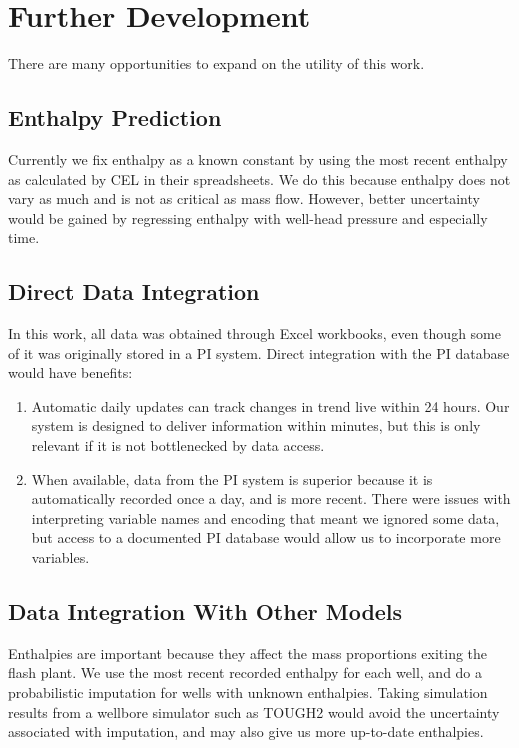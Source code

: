 \documentclass[a4paper, 12pt]{article}
\begin{document}

\section{Further Development}
There are many opportunities to expand on the utility of this work.

\subsection{Enthalpy Prediction}
Currently we fix enthalpy as a known constant by using the most recent enthalpy as calculated by CEL in their spreadsheets. We do this because enthalpy does not vary as much and is not as critical as mass flow. However, better uncertainty would be gained by regressing enthalpy with well-head pressure and especially time.

\subsection{Direct Data Integration}
In this work, all data was obtained through Excel workbooks, even though some of it was originally stored in a PI system. Direct integration with the PI database would have benefits:

\begin{enumerate}
\item Automatic daily updates can track changes in trend live within 24 hours. Our system is designed to deliver information within minutes, but this is only relevant if it is not bottlenecked by data access.
\item When available, data from the PI system is superior because it is automatically recorded once a day, and is more recent. There were issues with interpreting variable names and encoding that meant we ignored some data, but access to a documented PI database would allow us to incorporate more variables.
\end{enumerate}

\subsection{Data Integration With Other Models}
Enthalpies are important because they affect the mass proportions exiting the flash plant. We use the most recent recorded enthalpy for each well, and do a probabilistic imputation for wells with unknown enthalpies. Taking simulation results from a wellbore simulator such as TOUGH2 would avoid the uncertainty associated with imputation, and may also give us more up-to-date enthalpies.
\end{document}
